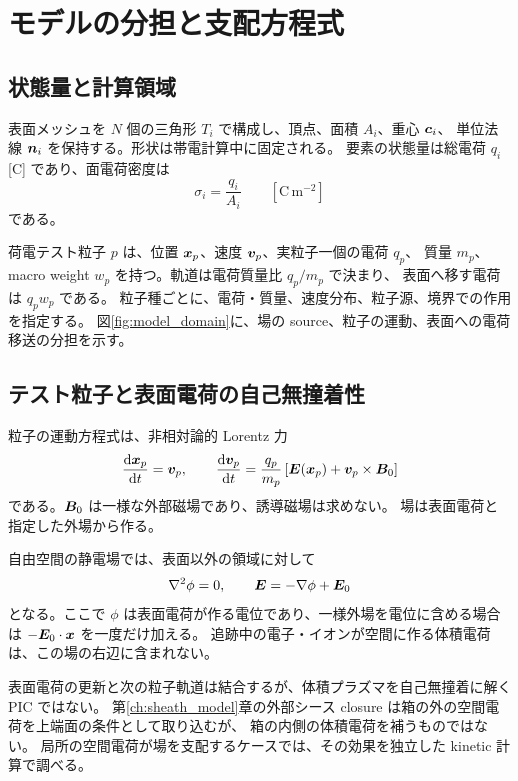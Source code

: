 \chapter{モデルの分担と支配方程式}
\label{ch:model}

\section{状態量と計算領域}
表面メッシュを $N$ 個の三角形 $T_i$ で構成し、頂点、面積 $A_i$、重心 $\bm{c}_i$、
単位法線 $\bm{n}_i$ を保持する。形状は帯電計算中に固定される。
要素の状態量は総電荷 $q_i$ [C] であり、面電荷密度は
\begin{equation}
  \sigma_i=\frac{q_i}{A_i}\qquad[\mathrm{C\,m^{-2}}]
  \label{eq:p0}
\end{equation}
である。

荷電テスト粒子 $p$ は、位置 $\bm{x}_p$、速度 $\bm{v}_p$、実粒子一個の電荷 $q_p$、
質量 $m_p$、macro weight $w_p$ を持つ。軌道は電荷質量比 $q_p/m_p$ で決まり、
表面へ移す電荷は $q_p w_p$ である。
粒子種ごとに、電荷・質量、速度分布、粒子源、境界での作用を指定する。
図\ref{fig:model_domain}に、場の source、粒子の運動、表面への電荷移送の分担を示す。


\section{テスト粒子と表面電荷の自己無撞着性}
粒子の運動方程式は、非相対論的 Lorentz 力
\begin{equation}
 \frac{\mathop{}\!\mathrm{d}\bm{x}_p}{\mathop{}\!\mathrm{d} t}=\bm{v}_p,\qquad
 \frac{\mathop{}\!\mathrm{d}\bm{v}_p}{\mathop{}\!\mathrm{d} t}
 =\frac{q_p}{m_p}\left[\bm{E}(\bm{x}_p)+\bm{v}_p\times\bm{B}_0\right]
 \label{eq:lorentz}
\end{equation}
である。$\bm{B}_0$ は一様な外部磁場であり、誘導磁場は求めない。
場は表面電荷と指定した外場から作る。

自由空間の静電場では、表面以外の領域に対して
\begin{equation}
 \nabla^2\phi=0,\qquad \bm{E}=-\nabla\phi+\bm{E}_0
\end{equation}
となる。ここで $\phi$ は表面電荷が作る電位であり、一様外場を電位に含める場合は
$-\bm{E}_0\cdot\bm{x}$ を一度だけ加える。
追跡中の電子・イオンが空間に作る体積電荷は、この場の右辺に含まれない。

表面電荷の更新と次の粒子軌道は結合するが、体積プラズマを自己無撞着に解く PIC ではない。
第\ref{ch:sheath_model}章の外部シース closure は箱の外の空間電荷を上端面の条件として取り込むが、
箱の内側の体積電荷を補うものではない。
局所の空間電荷が場を支配するケースでは、その効果を独立した kinetic 計算で調べる。

